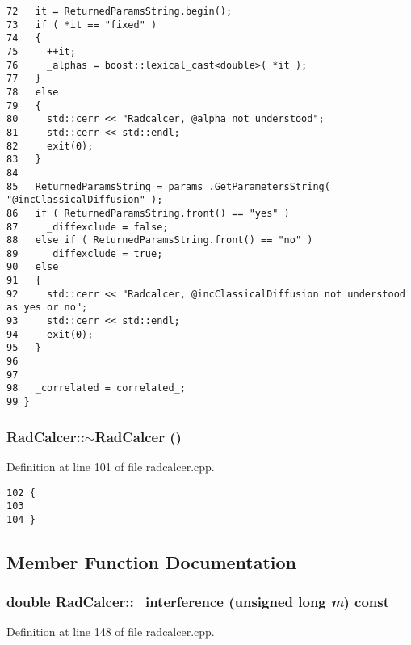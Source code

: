 \begin{Code}
\begin{verbatim}
72   it = ReturnedParamsString.begin();
73   if ( *it == "fixed" )
74   {
75     ++it;
76     _alphas = boost::lexical_cast<double>( *it );
77   }
78   else
79   {
80     std::cerr << "Radcalcer, @alpha not understood";
81     std::cerr << std::endl;
82     exit(0);
83   }
84 
85   ReturnedParamsString = params_.GetParametersString( "@incClassicalDiffusion" );
86   if ( ReturnedParamsString.front() == "yes" )
87     _diffexclude = false;
88   else if ( ReturnedParamsString.front() == "no" )
89     _diffexclude = true;
90   else
91   {
92     std::cerr << "Radcalcer, @incClassicalDiffusion not understood as yes or no";
93     std::cerr << std::endl;
94     exit(0);
95   }
96 
97 
98   _correlated = correlated_;
99 }
\end{verbatim}
\end{Code}


\subsubsection{\setlength{\rightskip}{0pt plus 5cm}RadCalcer::$\sim$RadCalcer ()}\label{classRadCalcer_74df4f3bd387f06932e3b677ba2a84bb}




Definition at line 101 of file radcalcer.cpp.

\begin{Code}\begin{verbatim}102 {
103 
104 }
\end{verbatim}
\end{Code}




\subsection{Member Function Documentation}
\subsubsection{\setlength{\rightskip}{0pt plus 5cm}double RadCalcer::\_\-interference (unsigned long {\em m}) const\hspace{0.3cm}{\tt  [private]}}\label{classRadCalcer_bd6b5fab0ce714f55b1d11776c02ba4d}




Definition at line 148 of file radcalcer.cpp.

